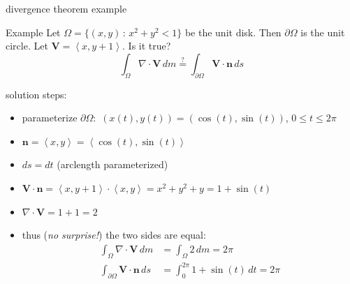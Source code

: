 \documentclass[10pt,
               svgnames,
               hyperref={colorlinks,
                         citecolor=DeepPink4,
                         linkcolor=FireBrick,
                         urlcolor=blue},
               usepdftitle=false]{beamer}
\newcommand{\bn}{\mathbf{n}}
\newcommand{\bV}{\mathbf{V}}
\newcommand{\Div}{\nabla\cdot}
\newcommand{\ip}[2]{\left<#1,#2\right>}
\begin{document}
\begin{frame}{divergence theorem example}

\begin{block}{Example}
Let $\Omega = \{(x,y)\,:\,x^2+y^2<1\}$ be the unit disk.  Then $\partial\Omega$ is the unit circle.  Let $\bV=\left<x,y+1\right>$.  Is it true?
	$$\int_\Omega \Div \bV\,dm \stackrel{?}{=} \int_{\partial\Omega} \bV\cdot \bn\,ds$$
\end{block}

\noindent solution steps:
\begin{itemize}
\item<2> parameterize $\partial\Omega$:\, $(x(t),y(t))=(\cos(t),\sin(t))$, $0\le t \le 2\pi$
\item<2> $\bn=\ip{x}{y}=\ip{\cos(t)}{\sin(t)}$
\item<2> $ds=dt$ (arclength parameterized)
\item<2> $\bV\cdot \bn = \left<x,y+1\right> \cdot \ip{x}{y} = x^2 + y^2 + y = 1 + \sin(t)$
\item<2> $\Div \bV = 1 + 1 = 2$
\item<2> thus (\emph{no surprise!}) the two sides are equal:
\begin{align*}
\int_\Omega \Div \bV\,dm &= \int_\Omega 2\,dm = 2 \pi\\
\int_{\partial\Omega} \bV\cdot \bn\,ds &= \int_0^{2\pi} 1 + \sin(t)\,dt = 2\pi
\end{align*}
\end{itemize}
\end{frame}
\end{document}
